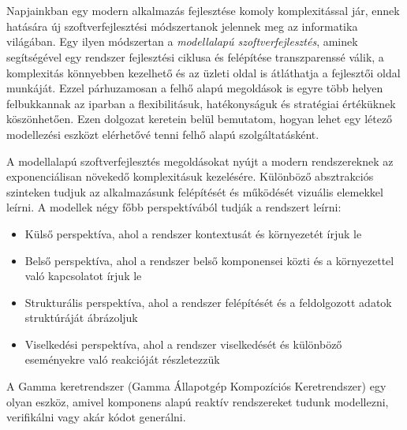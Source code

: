 \chapter{\bevezetes}

Napjainkban egy modern alkalmazás fejlesztése komoly komplexitással jár, ennek hatására új szoftverfejlesztési módszertanok jelennek meg az informatika világában. Egy ilyen módszertan a \textit{modellalapú szoftverfejlesztés}, aminek segítségével egy rendszer fejlesztési ciklusa és felépítése transzparenssé válik, a komplexitás könnyebben kezelhető és az üzleti oldal is átláthatja a fejlesztői oldal munkáját. Ezzel párhuzamosan a felhő alapú megoldások is egyre több helyen felbukkannak az iparban a flexibilitásuk, hatékonyságuk és stratégiai értéküknek köszönhetően. Ezen dolgozat keretein belül bemutatom, hogyan lehet egy létező modellezési eszközt elérhetővé tenni felhő alapú szolgáltatásként.

A modellalapú szoftverfejlesztés megoldásokat nyújt a modern rendszereknek az exponenciálisan növekedő komplexitásuk kezelésére. Különböző absztrakciós szinteken tudjuk az alkalmazásunk felépítését és működését vizuális elemekkel leírni. A modellek négy főbb perspektívából tudják a rendszert leírni\cite{cs1}:

 \begin{itemize}
 	\item Külső perspektíva, ahol a rendszer kontextusát és környezetét írjuk le
 	\item Belső perspektíva, ahol a rendszer belső komponensei közti és a környezettel való kapcsolatot írjuk le
 	\item Strukturális perspektíva, ahol a rendszer felépítését és a feldolgozott adatok struktúráját ábrázoljuk
 	\item Viselkedési perspektíva, ahol a rendszer viselkedését és különböző eseményekre való reakcióját részletezzük
 \end{itemize}
A Gamma keretrendszer \cite{DBLP:conf/icse/MolnarGVMV18} (Gamma Állapotgép Kompozíciós Keretrendszer) egy olyan eszköz, amivel komponens alapú reaktív rendszereket tudunk modellezni, verifikálni vagy akár kódot generálni.

